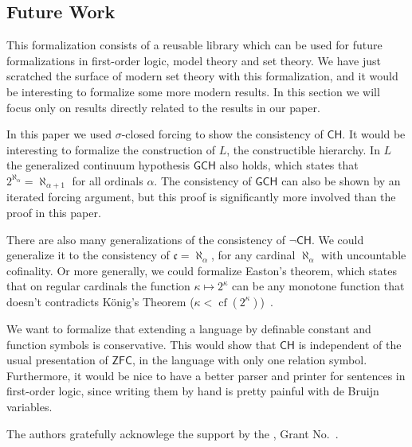 \documentclass[sigplan,10pt,review, autoref,anonymous]{acmart}
\newcommand{\ZFC}{\mathsf{ZFC}}
\newcommand{\CH}{\mathsf{CH}}
\theoremstyle{definition}
\DeclareMathOperator{\cf}{cf}
\begin{document}
\subsection{Future Work}

This formalization consists of a reusable library which can be used for future formalizations in first-order logic, model theory and set theory.
We have just scratched the surface of modern set theory with this formalization, and it would be interesting to formalize some more modern results.
In this section we will focus only on results directly related to the results in our paper.

In this paper we used \(\sigma\)-closed forcing to show the consistency of $\CH$.
It would be interesting to formalize the construction of $L$, the constructible hierarchy.
In $L$ the generalized continuum hypothesis $\mathsf{GCH}$ also holds, which states that $2^{\aleph_\alpha}=\aleph_{\alpha+1}$ for all ordinals $\alpha$.
The consistency of $\mathsf{GCH}$ can also be shown by an iterated forcing argument, but this proof is significantly more involved than the proof in this paper.

There are also many generalizations of the consistency of $\neg \mathsf{CH}$.
We could generalize it to the consistency of $\mathfrak{c}=\aleph_\alpha$, for any cardinal $\aleph_\alpha$ with uncountable cofinality.
Or more generally, we could formalize Easton's theorem, which states that on regular cardinals the function $\kappa\mapsto 2^\kappa$ can be any monotone function that doesn't contradicts K\"onig's Theorem ($\kappa<\cf(2^\kappa)$)~\cite{easton1970powers}.

We want to formalize that extending a language by definable constant and function symbols is conservative.
This would show that $\CH$ is independent of the usual presentation of $\ZFC$, in the language with only one relation symbol.
Furthermore, it would be nice to have a better parser and printer for sentences in first-order logic, since writing them by hand is pretty painful with de Bruijn variables.

\begin{acks}                            %
  The authors gratefully acknowlege the support by the
  , Grant
  No.~.
\end{acks}




\end{document}
